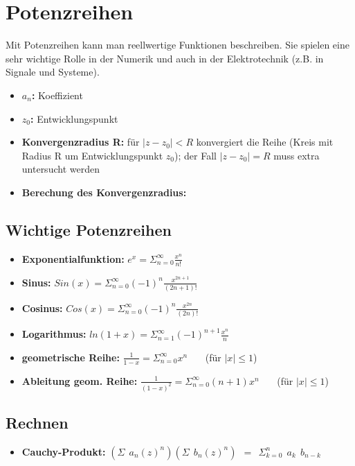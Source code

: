 \documentclass[a4paper,12pt]{article} %
\begin{document}
\section{Potenzreihen}
Mit Potenzreihen kann man reellwertige Funktionen beschreiben. Sie spielen eine sehr wichtige Rolle in der Numerik und auch in der Elektrotechnik (z.B. in Signale und Systeme).
\begin{center}
\end{center}
\begin{itemize}
\item \textbf{$a_n$:} Koeffizient
\item \textbf{$z_0$:} Entwicklungspunkt
\item \textbf{Konvergenzradius R:} für $|z-z_0| < R$ konvergiert die Reihe (Kreis mit Radius R um Entwicklungspunkt $z_0$); der Fall $|z-z_0| = R$ muss extra untersucht werden
\item \textbf{Berechung des Konvergenzradius: }\\
\begin{center}
\end{center}
\end{itemize}

\subsection{Wichtige Potenzreihen}
\begin{itemize}
\item \textbf{Exponentialfunktion: } $e^x = \Sigma_{n=0}^{\infty}\frac{x^n}{n!}$
\item \textbf{Sinus: } $Sin(x) = \Sigma_{n=0}^{\infty}(-1)^n\frac{x^{2n+1}}{(2n+1)!}$
\item \textbf{Cosinus: } $Cos(x) = \Sigma_{n=0}^{\infty}(-1)^n\frac{x^{2n}}{(2n)!}$
\item \textbf{Logarithmus: } $ln(1+x) = \Sigma_{n=1}^{\infty}(-1)^{n+1}\frac{x^n}{n}$
\item \textbf{geometrische Reihe: } $\frac{1}{1-x} = \Sigma_{n=0}^{\infty} x^n$ \ \ \ (für $|x| \leq 1$)
\item \textbf{Ableitung geom. Reihe: } $\frac{1}{(1-x)^2} = \Sigma_{n=0}^{\infty} (n+1) x^n$  \ \ \ (für $|x| \leq 1$)
\end{itemize}

\subsection{Rechnen}
\begin{itemize}
\item \textbf{Cauchy-Produkt:} $(\Sigma \ \ a_n (z)^n) (\Sigma \ \ b_n (z)^n) \ \ = \ \ \Sigma_{k=0}^{n} \ \ a_k \ \ b_{n-k} $
\end{itemize}
\end{document}
